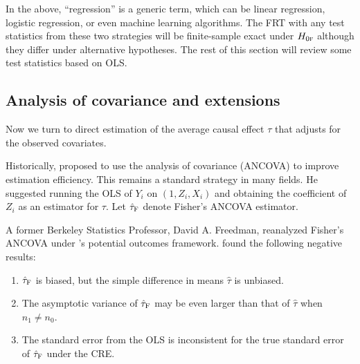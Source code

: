 In the above,  ``regression'' is a generic term, which can be linear regression, logistic regression, or even machine learning algorithms. The FRT with any test statistics from these two strategies will be finite-sample exact under $H_{0\textsc{f}}$ although they differ under alternative hypotheses. 
The rest of this section will review some test statistics based on OLS. 



\subsection{Analysis of covariance and extensions}\label{sec::ancova}

Now we turn to direct estimation of the average causal effect $\tau$ that adjusts for the observed covariates. 

Historically, \citet{fisher1925statistical} proposed to use the analysis of covariance (ANCOVA) to improve estimation efficiency. This remains a standard strategy in many fields. He suggested running the OLS of $Y_i$ on $(1, Z_i, X_i)$ and obtaining the coefficient of $Z_i$ as an estimator for $\tau$. Let $\hat{\tau}_\textsc{F}$ denote Fisher's ANCOVA estimator. 


A former Berkeley Statistics Professor, David A. Freedman, reanalyzed Fisher's ANCOVA under \citet{Neyman:1923}'s potential outcomes framework. \citet{freedman2008regression_a, freedman2008regression_b} found the following negative results:
\begin{enumerate}
[(1)]
\item
$\hat{\tau}_\textsc{F}$ is biased, but the simple difference in means $\hat{\tau}$ is unbiased.
\item 
The asymptotic variance of $\hat{\tau}_\textsc{F}$ may be even larger than that of $\hat{\tau}$ when $n_1\neq n_0$.
\item 
The standard error from the OLS is inconsistent for the true standard error of $\hat{\tau}_\textsc{F}$ under the CRE.   
\end{enumerate}


